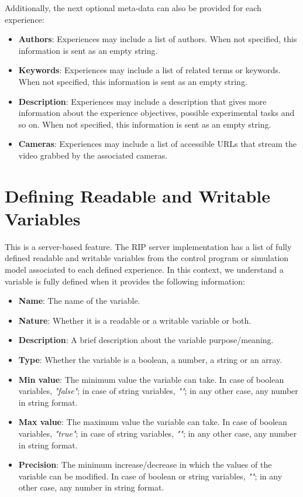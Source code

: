 Additionally, the next optional meta-data can also be provided for each experience:

\begin{itemize}
    \item \textbf{Authors}: Experiences may include a list of authors. When not specified, this information is sent as an empty string.
    \item \textbf{Keywords}: Experiences may include a list of related terms or keywords. When not specified, this information is sent as an empty string.
    \item \textbf{Description}: Experiences may include a description that gives more information about the experience objectives, possible experimental tasks and so on. When not specified, this information is sent as an empty string.
    \item \textbf{Cameras}: Experiences may include a list of accessible URLs that stream the video grabbed by the associated cameras.
\end{itemize}

\section{Defining Readable and Writable Variables}
This is a server-based feature. The RIP server implementation has a list of fully defined readable and writable variables from the control program or simulation model associated to each defined experience. In this context, we understand a variable is fully defined when it provides the following information:

\begin{itemize}
    \item \textbf{Name}: The name of the variable.
    \item \textbf{Nature}: Whether it is a readable or a writable variable or both.
    \item \textbf{Description}: A brief description about the variable purpose/meaning.
    \item \textbf{Type}: Whether the variable is a boolean, a number, a string or an array.
    \item \textbf{Min value}: The minimum value the variable can take. In case of boolean variables, \textit{"false"}; in case of string variables, \textit{""}; in any other case, any number in string format.
    \item \textbf{Max value}: The maximum value the variable can take. In case of boolean variables, \textit{"true"}; in case of string variables, \textit{""}; in any other case, any number in string format.
    \item \textbf{Precision}: The minimum increase/decrease in which the values of the variable can be modified. In case of boolean or string variables, \textit{""}; in any other case, any number in string format.
\end{itemize}

